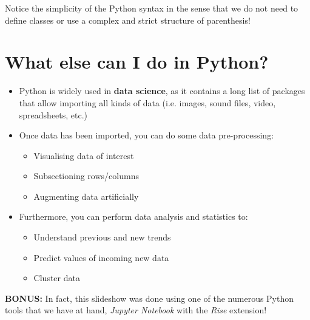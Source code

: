 \documentclass[11pt]{article}
\providecommand{\tightlist}{%
      \setlength{\itemsep}{0pt}\setlength{\parskip}{0pt}}
\begin{document}
    Notice the simplicity of the Python syntax in the sense that we do not
need to define classes or use a complex and strict structure of
parenthesis!

    \section{What else can I do in
Python?}\label{what-else-can-i-do-in-python}

    \begin{itemize}
\tightlist
\item
  Python is widely used in \textbf{data science}, as it contains a long
  list of packages that allow importing all kinds of data (i.e. images,
  sound files, video, spreadsheets, etc.)
\end{itemize}

    \begin{itemize}
\tightlist
\item
  Once data has been imported, you can do some data pre-processing:

  \begin{itemize}
  \tightlist
  \item
    Visualising data of interest
  \item
    Subsectioning rows/columns
  \item
    Augmenting data artificially
  \end{itemize}
\end{itemize}

    \begin{itemize}
\tightlist
\item
  Furthermore, you can perform data analysis and statistics to:

  \begin{itemize}
  \tightlist
  \item
    Understand previous and new trends
  \item
    Predict values of incoming new data
  \item
    Cluster data
  \end{itemize}
\end{itemize}

    \textbf{BONUS:} In fact, this slideshow was done using one of the
numerous Python tools that we have at hand, \emph{Jupyter Notebook} with
the \emph{Rise} extension!
\end{document}
